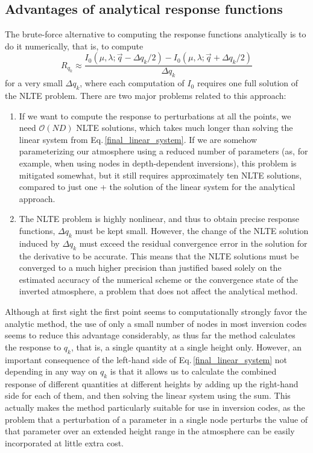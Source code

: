 \documentclass[referee]{aa}
\begin{document}
\subsection{Advantages of analytical response functions}

The brute-force alternative to computing the response functions analytically is to do it numerically, that is, to compute
\begin{equation}
 R_{q_k} \approx \frac{I_0(\mu,\lambda; \vec{q} - \Delta q_k/2) - I_0(\mu,\lambda; \vec{q}+\Delta q_k/2)}{\Delta q_k}
 \label{fin_diff}
\end{equation}
for a very small $\Delta q_k$, where each computation of $I_0$ requires one full solution of the NLTE problem. There are two major problems related to this approach:
\begin{enumerate}
 \item If we want to compute the response to perturbations at all the points, we need $\mathcal{O}(ND)$ NLTE solutions, which takes much longer than solving the linear system from Eq.\,\ref{final_linear_system}. If we are somehow parameterizing our atmosphere using a reduced number of parameters (as, for example, when using nodes in depth-dependent inversions), this problem is mitigated somewhat, but it still requires approximately ten NLTE solutions, compared to just one + the solution of the linear system for the analytical approach.
 \item The NLTE problem is highly nonlinear, and thus to obtain precise response functions, $\Delta q_k$ must be kept small. However, the change of the NLTE solution induced by $\Delta q_k$ must exceed the residual convergence error in the solution for the derivative to be accurate. This means that the NLTE solutions must be converged to a much higher precision than justified based solely on the estimated accuracy of the numerical scheme or the convergence state of the inverted atmosphere, a problem that does not affect the analytical method.
\end{enumerate}
Although at first sight the first point seems to computationally strongly favor the analytic method, the use of only a small number of nodes in most inversion codes seems to reduce this advantage considerably, as thus far the method calculates the response to $q_k$, that is, a single quantity at a single height only. However, an important consequence of the left-hand side of Eq.\,\ref{final_linear_system} not depending in any way on $q_k$ is that it allows us to calculate the combined response of different quantities at different heights by adding up the right-hand side for each of them, and then solving the linear system using the sum. This actually makes the method particularly suitable for use in inversion codes, as the problem that a perturbation of a parameter in a single node perturbs the value of that parameter over an extended height range in the atmosphere can be easily incorporated at little extra cost.
\end{document}
